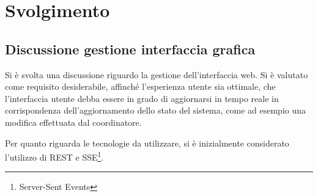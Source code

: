 \section{Svolgimento}

\subsection{Discussione gestione interfaccia grafica}
Si è svolta una discussione riguardo la gestione dell'interfaccia web. Si è valutato come requisito desiderabile, affinché l'esperienza utente sia ottimale, che l'interfaccia utente debba essere in grado di aggiornarsi in tempo reale in corrispondenza dell'aggiornamento dello stato del sistema, come ad esempio una modifica effettuata dal coordinatore.

Per quanto riguarda le tecnologie da utilizzare, si è inizialmente considerato l'utilizzo di REST e SSE\footnote{Server-Sent Events}.